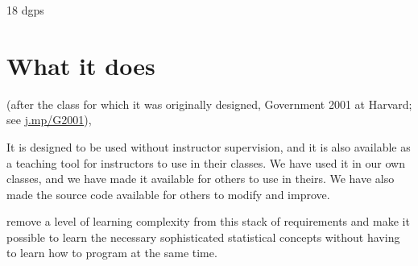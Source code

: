 \documentclass[12pt]{article}
\theoremstyle{definition}
\begin{document}
18 dgps

\section{What it does}


(after the class for which it was originally designed, Government 2001 at Harvard; see \href{https://j.mp/G2001}{j.mp/G2001}), 

It is designed to be used without instructor supervision, and it is also available as a teaching tool for instructors to use in their classes.  We have used it in our own classes, and we have made it available for others to use in theirs.  We have also made the source code available for others to modify and improve.



remove a level of learning complexity from this stack of requirements and make it possible to learn the necessary sophisticated statistical concepts without having to learn how to program at the same time.  



\singlespace
\printbibliography
\end{document}
